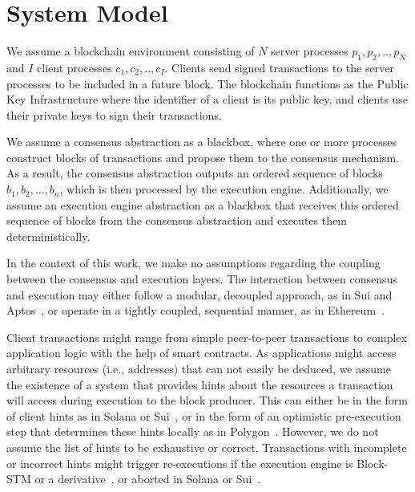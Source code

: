 \section{System Model}
\label{sec:systemmodel}

We assume a blockchain environment consisting of $N$ server processes $p_1, p_2,..,p_N$ and $I$ client processes $c_1, c_2,..,c_I$. Clients send signed transactions to the server processes to be included in a future block.
The blockchain functions as the Public Key Infrastructure where the identifier of a client is its public key, and clients use their private keys to sign their transactions.

We assume a consensus abstraction as a blackbox, where one or more processes construct blocks of transactions and propose them to the consensus mechanism. As a result, the consensus abstraction outputs an ordered sequence of blocks $b_1, b_2, \dots, b_n$, which is then processed by the execution engine. Additionally, we assume an execution engine abstraction as a blackbox that receives this ordered sequence of blocks from the consensus abstraction and executes them deterministically.

In the context of this work, we make no assumptions regarding the coupling between the consensus and execution layers. The interaction between consensus and execution may either follow a modular, decoupled approach, as in Sui and Aptos~\cite{sui,aptos}, or operate in a tightly coupled, sequential manner, as in Ethereum~\cite{ethereum}.

Client transactions might range from simple peer-to-peer transactions to complex application logic with the help of smart contracts. As applications might access arbitrary resources (i.e., addresses) that can not easily be deduced, we assume the existence of a system that provides hints about the resources a transaction will access during execution to the block producer. This can either be in the form of client hints as in Solana or Sui~\cite{solana,sui}, or in the form of an optimistic pre-execution step that determines these hints locally as in Polygon~\cite{polygonupdate}. However, we do not assume the list of hints to be exhaustive or correct. Transactions with incomplete or incorrect hints might trigger re-executions if the execution engine is Block-STM or a derivative~\cite{blockstm,chiron}, or aborted in Solana or Sui~\cite{solana,sui}.
